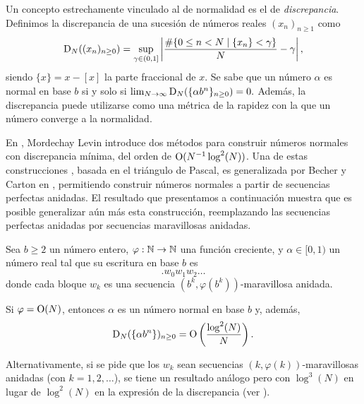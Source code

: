 Un concepto estrechamente vinculado al de normalidad es el de
\emph{discrepancia}. Definimos la discrepancia de una sucesión de números
reales $(x_n)_{n \geq 1}$ como
\[
	\operatorname{D}_{N}((x_n)_{n \geq 0})
	= \sup_{\gamma \in (0,1]} \left\vert
		\frac{\# \lbrace 0 \leq n < N \;\vert\; \lbrace x_n \rbrace < \gamma \rbrace}
		{N} - \gamma
	\right\vert,
\]
siendo $\lbrace x \rbrace = x - [x]$ la parte fraccional de $x$. Se sabe que
un número $\alpha$ es normal en base $b$ si y solo si
$\lim_{N \to \infty} \operatorname{D}_{N}(\lbrace \alpha b^n \rbrace_{n \geq 0}) = 0.$
Además, la
discrepancia puede utilizarse como una métrica de la rapidez con la que un
número converge a la normalidad.


En \cite{levin-discrepancy-estimate}, Mordechay Levin introduce dos
métodos para construir números normales con discrepancia mínima, del orden de
$\operatorname{O}(N^{-1}\log^2(N))$. Una de estas construcciones
\cite[Theorem 2]{levin-discrepancy-estimate}, basada en el triángulo de Pascal,
es generalizada por Becher y
Carton en \cite{becher-nested-perfect}, permitiendo construir números normales
a partir de secuencias perfectas anidadas.
El resultado que presentamos a continuación muestra que es posible generalizar
aún más esta construcción, reemplazando las secuencias perfectas anidadas
por secuencias maravillosas anidadas.

\begin{theorem}
\label{theorem:discrepancy-bound}
Sea $b \geq 2$ un número entero,
$\varphi: \mathbb{N} \to \mathbb{N}$ una función creciente,
y $\alpha \in [0, 1)$ un
número real tal que su escritura en base $b$ es
\[ .w_0w_1w_2\dots \]
donde cada bloque $w_k$ es una secuencia $(b^k, \varphi(b^k))$-maravillosa
anidada.

Si $\varphi = \operatorname{O}(N)$, entonces $\alpha$ es un número normal en base $b$ y,
además,
\[ \operatorname{D}_{N}(\lbrace \alpha b^n \rbrace)_{n\geq0}
	= \operatorname{O}\left( \frac{\log^2(N)}{N} \right). \]
\end{theorem}


Alternativamente, si se pide que los $w_k$ sean secuencias
$(k, \varphi(k))$-maravillosas anidadas (con $k = 1, 2, \dots$),
se tiene un resultado análogo pero
con $\log^3(N)$ en lugar de $\log^2(N)$ en la expresión de la discrepancia
(ver \cite{levin-discrepancy-estimate}).

